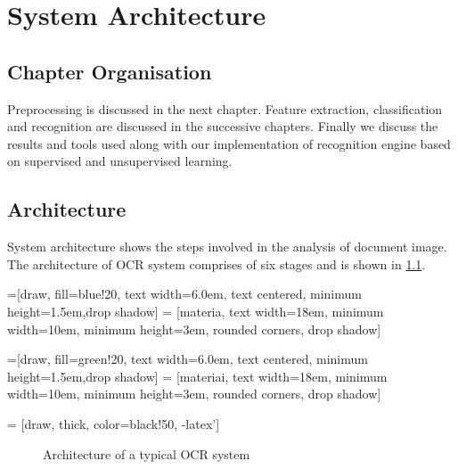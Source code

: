 \chapter{System Architecture}
\section{Chapter Organisation}
Preprocessing is discussed in the next chapter. Feature extraction, classification and recognition are discussed in the successive chapters. Finally we discuss the results and tools used along with our implementation of recognition engine based on supervised and unsupervised learning.
\section{Architecture}
System architecture shows the steps involved in the analysis of document image.
The architecture of OCR system comprises of six stages and is shown in \ref{OCRA}.

=[draw, fill=blue!20, text width=6.0em, text centered,
  minimum height=1.5em,drop shadow]
 = [materia, text width=18em, minimum width=10em,
  minimum height=3em, rounded corners, drop shadow]

=[draw, fill=green!20, text width=6.0em, text centered,
  minimum height=1.5em,drop shadow]
 = [materiai, text width=18em, minimum width=10em,
  minimum height=3em, rounded corners, drop shadow]

 = [draw, thick, color=black!50, -latex']
\newcommand{\practica}[2]{node (p#1) [practica]
  {Step #1\\{\large\textit{#2}}}}

\newcommand{\practicai}[2]{node (p#1) [practicai]
  {Step #1\\{\large\textit{#2}}}}

  \begin{figure}\centering
{}
    \caption{Architecture of a typical OCR system}\label{OCRA}
\end{figure}

